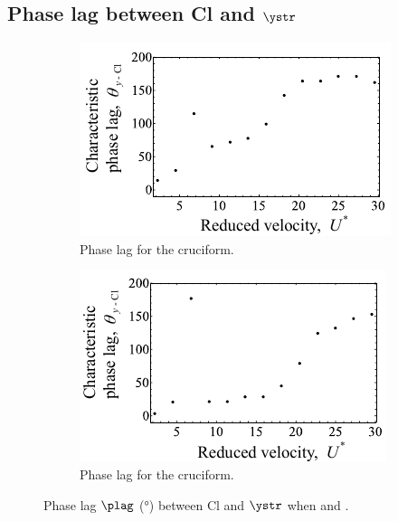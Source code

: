 \documentclass[a4paper,fleqn]{cas-sc}
\begin{document}
\subsection{Phase lag between Cl and $\ystr$} \label{ssec:phaseLag22500}
\begin{figure}
  \centering
  \begin{subfigure}[h]{0.4\textwidth}
    \includegraphics[width=\textwidth]{figs/phaseLag2}
    \caption{Phase lag for the \angtw{} cruciform.}
    \label{fig:phaseLag225deg}
  \end{subfigure}
  \hspace{6mm}
  \begin{subfigure}[h]{0.4\textwidth}
    \includegraphics[width=\textwidth]{figs/phaseLag1}
    \caption{Phase lag for the \angon{} cruciform.}
    \label{fig:phaseLag00deg}
  \end{subfigure}

  \caption{Phase lag $\plag$ (\si{\degree}) between Cl and $\ystr$ when \angtw{} and \angon{}.}
  \label{fig:phaseLag22500deg}
\end{figure}
\end{document}
